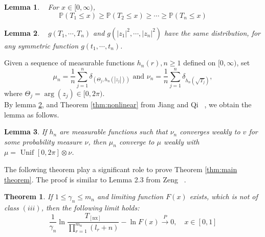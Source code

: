 \documentclass[12pt]{article}
\theoremstyle{plain}
\newtheorem{thm}{\textbf{Theorem}}
\newtheorem{lem}{\textbf{Lemma}}
\theoremstyle{definition}
\theoremstyle{remark}
\begin{document}
\begin{lem}\label{lem: Zeng 2017   lem 2.3}~\cite{zeng2017}
For $x \in[0, \infty)$,
\begin{equation*}
\mathbb{P}\left(T_{1} \leq x\right) \geq \mathbb{P}\left(T_{2} \leq x\right) \geq \cdots   \geq \mathbb{P}\left(T_{n} \leq x\right)
\end{equation*}
\end{lem}
\begin{lem}\label{lem: Zeng2017 Lemma 2.2}~\cite{zeng2017}
$g\left(T_{1}, \cdots, T_{n}\right)$ and $g\left(\left|z_{1}\right|^{2}, \cdots,\left|z_{n}\right|^{2}\right)$ have the same distribution, for any symmetric function $g(t_1,\cdots,t_n)$.
\end{lem}

Given a sequence of measurable functions $h_{n}(r), n\geq 1$ defined on $[0, \infty)$, set
\begin{equation*}
\mu_{n}=\frac{1}{n} \sum_{j=1}^{n} \delta_{\left(\Theta_{j}, h_{n}\left(\left|z_{j}\right|\right)\right)} \text { and } \nu_{n}=\frac{1}{n} \sum_{j=1}^{n} \delta_{h_{n}\left(\sqrt{T_{j}}\right)},
\end{equation*}
where $\Theta_{j}=\arg \left(z_{j}\right) \in[0,2 \pi)$.\\


By lemma  \ref{lem: Zeng2017 Lemma 2.2}, and Theorem
\ref{thm:nonlinear} from Jiang and Qi ~\cite{JiangQi2019}, we obtain
the lemma as follows.
\begin{lem}\label{lem: Zeng 2017   lem ?}
If {$h_n$} are measurable functions such that  $\nu_{n}$ converges weakly to $v$ for some probability measure $\nu$, then $\mu_{n}$ converge to $\mu$ weakly with $\mu=\text { Unif }[0,2 \pi] \otimes \nu$.
\end{lem}

The following theorem play a significant role to prove Theorem
\ref{thm:main theorem}. The proof is similar to Lemma 2.3 from Zeng
~\cite{zeng2017}.

\begin{thm}\label{thm: ln F(x) limit}
    If $1\leq\gamma_{n}\leq  m_n$ and limiting function $F(x)$ exists, which is not of class $(iii)$, then the following limit holds:
    \begin{equation}
    \frac{1}{\gamma_{n}} \ln \frac{T_{[\mathrm{nx}]}}{\prod_{r=1}^{m_n}(l_r+n)}-\ln F(x) \stackrel{P}{\rightarrow} 0, \quad x \in[0,1]
    \end{equation}
\end{thm}
\end{document}
